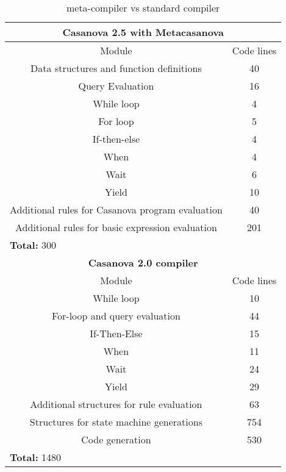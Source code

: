 \vspace{-1.5cm}
\begin{table}
	\centering
	\tiny
	\begin{tabular}{|c|c|}
		\hline
		\multicolumn{2}{|c|}{\textbf{Casanova 2.5 with Metacasanova}} \\
		\hline
		Module & Code lines \\
		\hline
		Data structures and function definitions & 40 \\
		\hline
		Query Evaluation & 16 \\
		\hline
		While loop & 4 \\
		\hline
		For loop & 5 \\
		\hline
		If-then-else & 4 \\
		\hline
		When & 4 \\
		\hline
		Wait & 6 \\
		\hline
		Yield & 10 \\
		\hline
		Additional rules for Casanova program evaluation & 40 \\
		\hline
		Additional rules for basic expression evaluation & 201 \\
		\hline
		\multicolumn{2}{|l|}{\textbf{Total: } 300} \\
		\hline
		\multicolumn{2}{|c|}{\textbf{Casanova 2.0 compiler}} \\
		\hline
		Module & Code lines \\
		\hline
		While loop & 10 \\
		\hline
		For-loop and query evaluation & 44 \\
		\hline
		If-Then-Else & 15 \\
		\hline
		When & 11 \\
		\hline
		Wait & 24 \\
		\hline
		Yield & 29 \\
		\hline
		Additional structures for rule evaluation & 63 \\
		\hline
		Structures for state machine generations & 754 \\
		\hline
		Code generation & 530 \\
		\hline
		\multicolumn{2}{|l|}{\textbf{Total: } 1480} \\
		\hline			
	\end{tabular}	
	\caption{meta-compiler vs standard compiler}
	\label{tab:compiler_comparison}
\end{table}